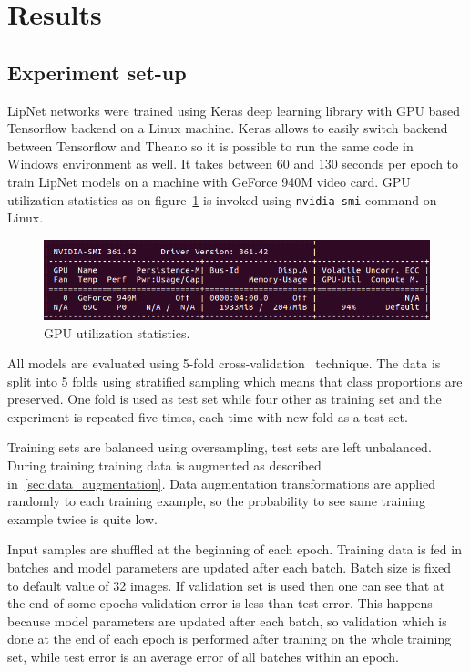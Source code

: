 \documentclass[a4paper, 11pt, table]{article}
\begin{document}
\newpage

\section{Results}

\subsection{Experiment set-up}

LipNet networks were trained using Keras deep learning library with GPU based Tensorflow backend on a Linux machine. Keras allows to easily switch backend between Tensorflow and Theano so it is possible to run the same code in Windows environment as well. It takes between 60 and 130 seconds per epoch to train LipNet models on a machine with GeForce 940M video card. GPU utilization statistics as on figure~\ref{fig:nvidia_smi} is invoked using \texttt{nvidia-smi} command on Linux.

\begin{figure}[H]
\centering
\includegraphics[width=\textwidth]{nvidia_smi.png} 
\caption{GPU utilization statistics.}
\label{fig:nvidia_smi}
\end{figure}

All models are evaluated using 5-fold cross-validation~\cite{Kohavi:1995:SCB:1643031.1643047} technique. The data is split into 5 folds using stratified sampling which means that class proportions are preserved. One fold is used as test set while four other as training set and the experiment is repeated five times, each time with new fold as a test set.

Training sets are balanced using oversampling, test sets are left unbalanced. During training training data is augmented as described in~\ref{sec:data_augmentation}. Data augmentation transformations are applied randomly to each training example, so the probability to see same training example twice is quite low. 

Input samples are shuffled at the beginning of each epoch. Training data is fed in batches and model parameters are updated after each batch. Batch size is fixed to default value of 32 images. If validation set is used then one can see that at the end of some epochs validation error is less than test error. This happens because model parameters are updated after each batch, so validation which is done at the end of each epoch is performed after training on the whole training set, while test error is an average error of all batches within an epoch.
\end{document}
